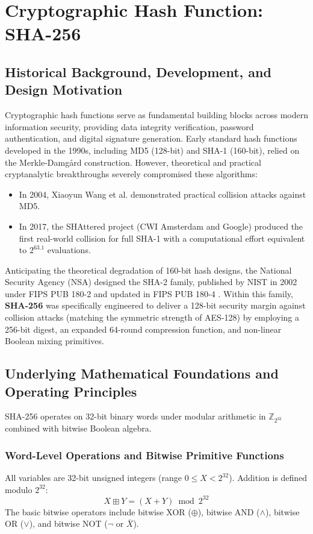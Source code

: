 \chapter{Cryptographic Hash Function: SHA-256}
\label{ch:sha256}

\section{Historical Background, Development, and Design Motivation}
Cryptographic hash functions serve as fundamental building blocks across modern information security, providing data integrity verification, password authentication, and digital signature generation. Early standard hash functions developed in the 1990s, including MD5 (128-bit) and SHA-1 (160-bit), relied on the Merkle-Damg{\aa}rd construction. However, theoretical and practical cryptanalytic breakthroughs severely compromised these algorithms:
\begin{itemize}
    \item In 2004, Xiaoyun Wang et al. demonstrated practical collision attacks against MD5.
    \item In 2017, the SHAttered project (CWI Amsterdam and Google) produced the first real-world collision for full SHA-1 with a computational effort equivalent to $2^{63.1}$ evaluations.
\end{itemize}
Anticipating the theoretical degradation of 160-bit hash designs, the National Security Agency (NSA) designed the SHA-2 family, published by NIST in 2002 under FIPS PUB 180-2 and updated in FIPS PUB 180-4 \cite{fips180_4}. Within this family, \textbf{SHA-256} was specifically engineered to deliver a 128-bit security margin against collision attacks (matching the symmetric strength of AES-128) by employing a 256-bit digest, an expanded 64-round compression function, and non-linear Boolean mixing primitives.

\section{Underlying Mathematical Foundations and Operating Principles}
SHA-256 operates on 32-bit binary words under modular arithmetic in $\mathbb{Z}_{2^{32}}$ combined with bitwise Boolean algebra.

\subsection{Word-Level Operations and Bitwise Primitive Functions}
All variables are 32-bit unsigned integers (range $0 \le X < 2^{32}$). Addition is defined modulo $2^{32}$:
\begin{equation}
X \boxplus Y = (X + Y) \bmod 2^{32}
\end{equation}
The basic bitwise operators include bitwise XOR ($\oplus$), bitwise AND ($\wedge$), bitwise OR ($\vee$), and bitwise NOT ($\neg$ or $\bar{X}$).

